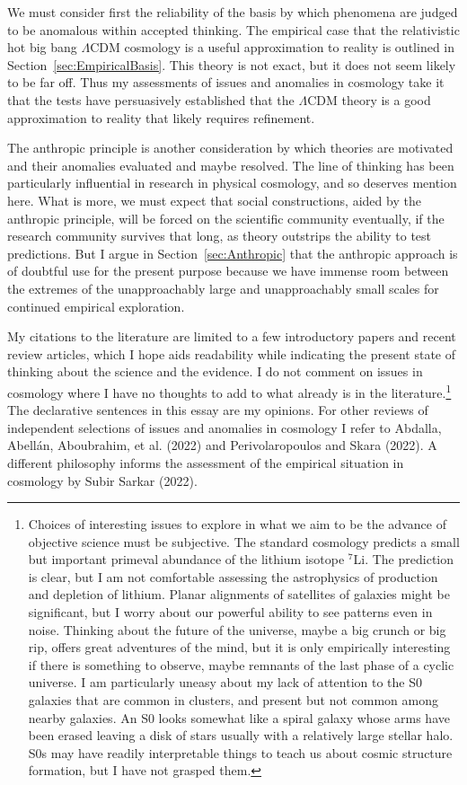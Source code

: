 \documentclass[fleqn,12pt]{article}
\begin{document}
We must consider first the reliability of the basis by which phenomena are judged to be anomalous within accepted thinking. The empirical case that the relativistic hot big bang $\Lambda$CDM cosmology is a useful approximation to reality is outlined in Section~\ref{sec:EmpiricalBasis}. This theory is not exact, but it does not seem likely to be far off. Thus my assessments of issues and anomalies in cosmology take it that the tests have persuasively established that the $\Lambda$CDM theory is a good approximation to reality that likely requires refinement.

The anthropic principle is another consideration by which theories are motivated and their anomalies evaluated and maybe resolved. The line of thinking has been particularly influential in research in physical cosmology, and so deserves mention here. What is more, we must expect that social constructions, aided by the anthropic principle, will be forced on the scientific community eventually, if the research community survives that long, as theory outstrips the ability to test predictions. But I argue in Section~\ref{sec:Anthropic} that the anthropic approach is of doubtful use for the present purpose because we have immense room between the extremes of the unapproachably large and unapproachably small scales for continued empirical exploration.

My citations to the literature are limited to a few introductory papers and recent review articles, which I hope aids readability while indicating the present state of thinking about the science and the evidence. I do not comment on issues in cosmology where I have no thoughts to add to what already is in the literature.\footnote{\label{fn:S0s}Choices of interesting issues to explore in what we aim to be the advance of objective science must be subjective. The standard cosmology predicts a small but important primeval abundance of the lithium isotope $^7$Li. The prediction is clear, but I am not comfortable assessing the astrophysics of production and depletion of lithium. Planar alignments of satellites of galaxies might be significant, but I worry about our powerful ability to see patterns even in noise. Thinking about the future of the universe, maybe a big crunch or big rip, offers great adventures of the mind, but it is only empirically interesting if there is something to observe, maybe remnants of the last phase of a cyclic universe. I am particularly uneasy about my lack of attention to the S0 galaxies that are common in clusters, and present but not common among nearby galaxies. An S0 looks somewhat like a spiral galaxy whose arms have been erased leaving a disk of stars usually with a relatively large stellar halo. S0s may have readily interpretable things to teach us about cosmic structure formation, but I have not grasped them.} The declarative sentences in this essay are my opinions. For other reviews of independent selections of issues and anomalies in cosmology I refer to Abdalla, Abell{\'a}n, Aboubrahim, et al. (2022) and Perivolaropoulos and Skara (2022). A different philosophy informs the assessment of the empirical situation in cosmology by Subir Sarkar (2022). 
\end{document}
